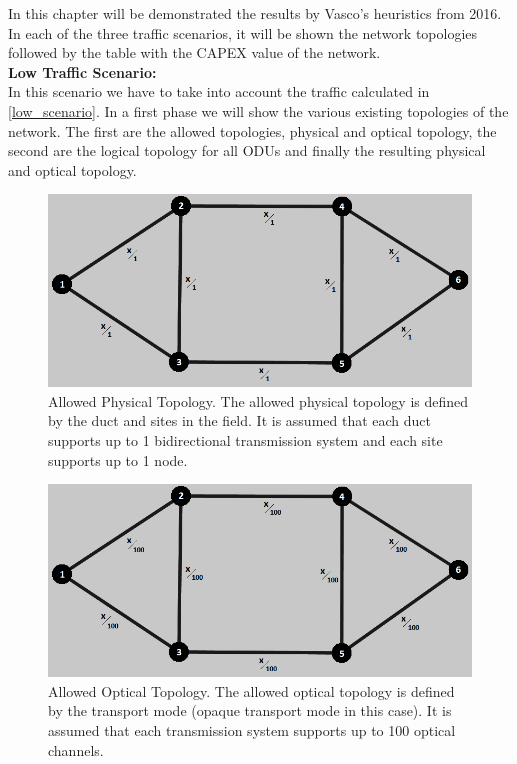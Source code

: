 In this chapter will be demonstrated the results by Vasco's heuristics from 2016. In each of the three traffic scenarios, it will be shown the network topologies followed by the table with the CAPEX value of the network.\\

\textbf{Low Traffic Scenario:}\\

In this scenario we have to take into account the traffic calculated in \ref{low_scenario}. In a first phase we will show the various existing topologies of the network. The first are the allowed topologies, physical and optical topology, the second are the logical topology for all ODUs and finally the resulting physical and optical topology.\\

\begin{figure}[H]
\centering
\includegraphics[width=13cm]{sdf/heuristic/opaque_survivability/low/allowed_physical_low}
\caption{Allowed Physical Topology. The allowed physical topology is defined by the duct and sites in the field. It is assumed that each duct supports up to 1 bidirectional transmission system and each site supports up to 1 node.}
\label{allowed_physical_surv_ref_low_heuristic}
\end{figure}

\begin{figure}[H]
\centering
\includegraphics[width=13cm]{sdf/heuristic/opaque_survivability/low/allowed_optical_low}
\caption{Allowed Optical Topology. The allowed optical topology is defined by the transport mode (opaque transport mode in this case). It is assumed that each transmission system supports up to 100 optical channels.}
\label{allowed_optical_surv_ref_low_heuristic}
\end{figure}

